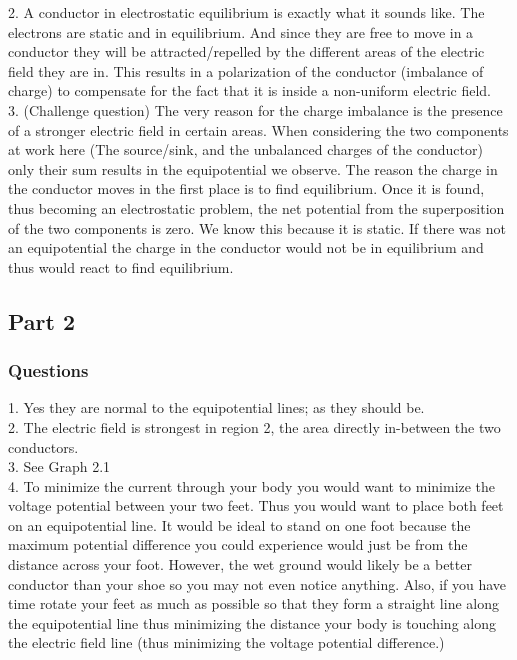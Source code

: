 \documentclass{article}
\begin{document}
2. A conductor in electrostatic equilibrium is exactly what it sounds like. The electrons are static and in equilibrium. And since they are free to move in a conductor they will be attracted/repelled by the different areas of the electric field they are in. This results in a polarization of the conductor (imbalance of charge) to compensate for the fact that it is inside a non-uniform electric field. \\

3. (Challenge question) The very reason for the charge imbalance is the presence of a stronger electric field in certain areas. When considering the two components at work here (The source/sink, and the unbalanced charges of the conductor) only their sum results in the equipotential we observe. The reason the charge in the conductor moves in the first place is to find equilibrium. Once it is found, thus becoming an electrostatic problem, the net potential from the superposition of the two components is zero. We know this because it is static. If there was not an equipotential the charge in the conductor would not be in equilibrium and thus would react to find equilibrium.

\subsection{Part 2}
\subsubsection{Questions}
1. Yes they are normal to the equipotential lines; as they should be.\\

2. The electric field is strongest in region 2, the area directly in-between the two conductors.\\

3. See Graph 2.1\\

4. To minimize the current through your body you would want to minimize the voltage potential between your two feet. Thus you would want to place both feet on an equipotential line. It would be ideal to stand on one foot because the maximum potential difference you could experience would just be from the distance across your foot. However, the wet ground would likely be a better conductor than your shoe so you may not even notice anything. Also, if you have time rotate your feet as much as possible so that they form a straight line along the equipotential line thus minimizing the distance your body is touching along the electric field line (thus minimizing the voltage potential difference.)\\
\end{document}

